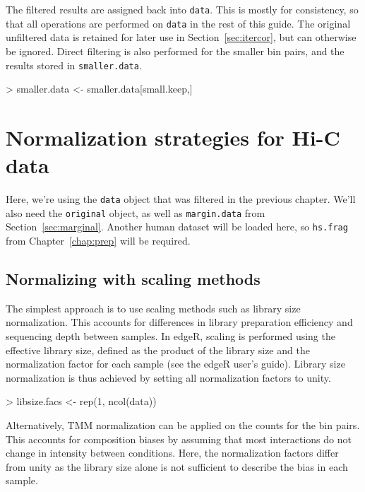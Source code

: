 \documentclass[12pt]{report}
\renewenvironment{Schunk}{\vspace{0pt}}{\vspace{0pt}}
\newcommand{\edgeR}{edgeR}
\newcommand{\code}[1]{{\small\texttt{#1}}}
\newenvironment{combox}
{ \begin{shaded}\begin{center}\begin{minipage}[t]{0.95\textwidth} }
{ \end{minipage}\end{center}\end{shaded} }
\begin{document}
The filtered results are assigned back into \code{data}.
This is mostly for consistency, so that all operations are performed on \code{data} in the rest of this guide.
The original unfiltered data is retained for later use in Section~\ref{sec:itercor}, but can otherwise be ignored.
Direct filtering is also performed for the smaller bin pairs, and the results stored in \code{smaller.data}.

\begin{Schunk}
\begin{Sinput}
> smaller.data <- smaller.data[small.keep,]
\end{Sinput}
\end{Schunk}

\chapter{Normalization strategies for Hi-C data}

\begin{combox}
Here, we're using the \code{data} object that was filtered in the previous chapter.
We'll also need the \code{original} object, as well as \code{margin.data} from Section~\ref{sec:marginal}.
Another human dataset will be loaded here, so \code{hs.frag} from Chapter~\ref{chap:prep} will be required.
\end{combox}

\section{Normalizing with scaling methods}
\label{sec:simplenorm}

The simplest approach is to use scaling methods such as library size normalization.
This accounts for differences in library preparation efficiency and sequencing depth between samples.
In \edgeR{}, scaling is performed using the effective library size, defined as the product of the library size and the normalization factor for each sample (see the \edgeR{} user's guide).
Library size normalization is thus achieved by setting all normalization factors to unity.

\begin{Schunk}
\begin{Sinput}
> libsize.facs <- rep(1, ncol(data))
\end{Sinput}
\end{Schunk}

Alternatively, TMM normalization \citep{oshlack2010tmm} can be applied on the counts for the bin pairs.
This accounts for composition biases by assuming that most interactions do not change in intensity between conditions.
Here, the normalization factors differ from unity as the library size alone is not sufficient to describe the bias in each sample.
\end{document}
